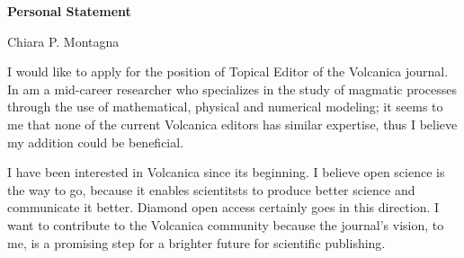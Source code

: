 \documentclass{report}
\begin{document}
\begin{center}
    \Huge \textbf{Personal Statement} 
    \par
    \vspace{2mm}
    \Large Chiara P. Montagna
\end{center}

\par
\vspace{1 cm}

I would like to apply for the position of Topical Editor of the Volcanica journal. In am a mid-career researcher who specializes in the study of magmatic processes through the use of mathematical, physical and numerical modeling; it seems to me that none of the current Volcanica editors has similar expertise, thus I believe my addition could be beneficial. 

I have been interested in Volcanica since its beginning. I believe open science is the way to go, because it enables scientitsts to produce better science and communicate it better. Diamond open access certainly goes in this direction. I want to contribute to the Volcanica community because the journal's vision, to me, is a promising step for a brighter future for scientific publishing. 
\end{document}
